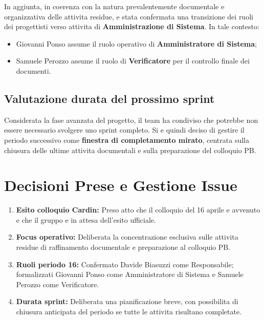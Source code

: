 \documentclass[a4paper, 11pt, oneside]{scrartcl}
\begin{document}
In aggiunta, in coerenza con la natura prevalentemente documentale e organizzativa delle attivita residue, e stata confermata una transizione dei ruoli dei progettisti verso attivita di \textbf{Amministrazione di Sistema}. In tale contesto:
\begin{itemize}[noitemsep, topsep=3pt]
	\item Giovanni Ponso assume il ruolo operativo di \textbf{Amministratore di Sistema};
	\item Samuele Perozzo assume il ruolo di \textbf{Verificatore} per il controllo finale dei documenti.
\end{itemize}

\subsection{Valutazione durata del prossimo sprint}
Considerata la fase avanzata del progetto, il team ha condiviso che potrebbe non essere necessario svolgere uno sprint completo. Si e quindi deciso di gestire il periodo successivo come \textbf{finestra di completamento mirato}, centrata sulla chiusura delle ultime attivita documentali e sulla preparazione del colloquio PB.

\newpage
\section{Decisioni Prese e Gestione Issue}

\begin{enumerate}
	\item \textbf{Esito colloquio Cardin:} Preso atto che il colloquio del 16 aprile e avvenuto e che il gruppo e in attesa dell'esito ufficiale.
	\item \textbf{Focus operativo:} Deliberata la concentrazione esclusiva sulle attivita residue di raffinamento documentale e preparazione al colloquio PB.
	\item \textbf{Ruoli periodo 16:} Confermato Davide Biasuzzi come Responsabile; formalizzati Giovanni Ponso come Amministratore di Sistema e Samuele Perozzo come Verificatore.
	\item \textbf{Durata sprint:} Deliberata una pianificazione breve, con possibilita di chiusura anticipata del periodo se tutte le attivita risultano completate.
\end{enumerate}
\end{document}
